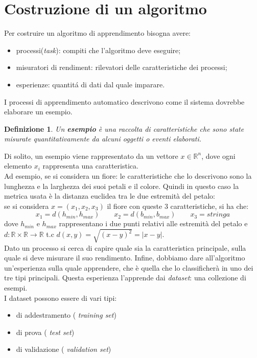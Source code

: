 \documentclass[a4paper,12pt,oneside]{book}
\begin{document}
\section{Costruzione di un algoritmo}\label{Costruzione}
Per costruire un algoritmo di apprendimento bisogna avere:
\begin{itemize}
\item processi(\textit{task}): compiti che l'algoritmo deve eseguire;
\item misuratori di rendiment: rilevatori delle caratteristiche dei processi;
\item esperienze: quantit\'{a} di dati dal quale imparare.
\end{itemize}
I processi di apprendimento automatico descrivono come il sistema dovrebbe elaborare un esempio.
\newtheorem{defin}{Definizione}
\begin{defin}
Un \textbf{esempio} \`e una raccolta di caratteristiche che sono state misurate quantitativamente da alcuni oggetti o eventi elaborati. 
\end{defin}
Di solito, un esempio viene rappresentato da un vettore $x\in \mathbb{R}^{n}$, dove ogni elemento $x_{i}$ rappresenta una caratteristica.\\
Ad esempio, se si considera un fiore: le caratteristiche che lo descrivono sono la lunghezza e la larghezza dei suoi petali e il colore. Quindi in questo caso la metrica usata \`e la distanza euclidea tra le due estremit\`{a} del petalo:\\
se si considera $x=(x_1,x_2,x_3)$ il fiore con queste 3 caratteristiche, si ha che:
$$x_{1}=d(h_{min},h_{max})\qquad x_{2}=d(b_{min},b_{max})\qquad x_{3}=stringa$$
dove $h_{min}$ e $h_{max}$ rappresentano i due punti relativi alle estremit\`{a} del petalo e $d:\mathbb{R} \times \mathbb{R} \longrightarrow \mathbb{R}$ t.c $d(x,y)=\sqrt{(x-y)^{2}}=|x-y|$.\\
Dato un processo si cerca di capire quale sia la caratteristica principale, sulla quale si deve misurare il suo rendimento.
Infine, dobbiamo dare all'algoritmo un'esperienza sulla quale apprendere, che \`e quella che lo classificher\`{a} in uno dei tre tipi principali.
Questa esperienza l'apprende dai \textit{dataset}: una collezione di esempi.\\
I dataset possono essere di vari tipi:
\begin{itemize}
\item di addestramento ( \textit{training set})
\item di prova ( \textit{test set})
\item di validazione ( \textit{validation set})
\end{itemize}
\end{document}
